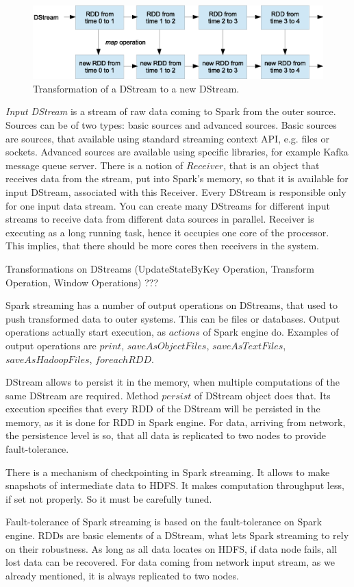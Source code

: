 \begin{figure}[H]
  \centering
  \includegraphics [width=1.0\textwidth]{images/DStreamWithTransformation}
  \caption{Transformation of a DStream to a new DStream.}
  \label{fig:DStreamWithTransformation}
\end{figure}

\textit{Input DStream} is a stream of raw data coming to Spark from the outer source.
Sources can be of two types: basic sources and advanced sources.
Basic sources are sources, that available using standard streaming context API, e.g. files or sockets.
Advanced sources are available using specific libraries, for example Kafka message queue server.
There is a notion of $Receiver$, that is an object that receives data from the stream, put into Spark's memory, so that it is available for input DStream, associated with this Receiver.
Every DStream is responsible only for one input data stream.
You can create many DStreams for different input streams to receive data from different data sources in parallel.
Receiver is executing as a long running task, hence it occupies one core of the processor.
This implies, that there should be more cores then receivers in the system.

Transformations on DStreams (UpdateStateByKey Operation, Transform Operation, Window Operations) ???

Spark streaming has a number of output operations on DStreams, that used to push transformed data to outer systems.
This can be files or databases.
Output operations actually start execution, as $actions$ of Spark engine do.
Examples of output operations are $print$, $saveAsObjectFiles$, $saveAsTextFiles$, $saveAsHadoopFiles$, $foreachRDD$.

DStream allows to persist it in the memory, when multiple computations of the same DStream are required.
Method $persist$ of DStream object does that.
Its execution specifies that every RDD of the DStream will be persisted in the memory, as it is done for RDD in Spark engine.
For data, arriving from network, the persistence level is so, that all data is replicated to two nodes to provide fault-tolerance.

There is a mechanism of checkpointing in Spark streaming.
It allows to make snapshots of intermediate data to HDFS.
It makes computation throughput less, if set not properly.
So it must be carefully tuned.

Fault-tolerance of Spark streaming is based on the fault-tolerance on Spark engine.
RDDs are basic elements of a DStream, what lets Spark streaming to rely on their robustness.
As long as all data locates on HDFS, if data node fails, all lost data can be recovered.
For data coming from network input stream, as we already mentioned, it is always replicated to two nodes.